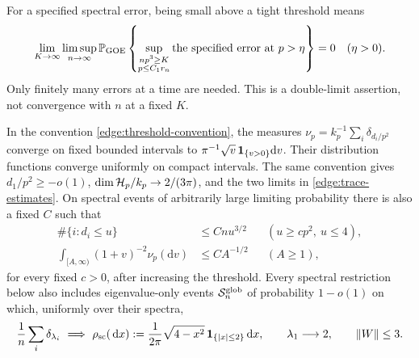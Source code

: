 For a specified spectral error, being small above a tight threshold means
\begin{equation}\label{edge:threshold-convention}
 \lim_{K\to\infty}\limsup_{n\to\infty}
 \mathbb P_{\rm GOE}\left\{
 \sup_{\substack{np^3\ge K\\p\le C_1r_n}}
       \text{the specified error at \(p\)}>\eta\right\}=0
 \quad(\eta>0).
\end{equation}
Only finitely many errors at a time are needed.  This is a double-limit
assertion, not convergence with \(n\) at a fixed \(K\).

\begin{lemma}
\label{edge:spectral}
In the convention \eqref{edge:threshold-convention}, the measures
\(\nu_p=k_p^{-1}\sum_i\delta_{d_i/p^2}\) converge on fixed bounded
intervals to \(\pi^{-1}\sqrt v\,\mathbf 1_{\{v>0\}}\mathrm dv\).  Their
distribution functions converge uniformly on compact intervals.
The same convention gives \(d_1/p^2\ge-o(1)\),
\(\dim\mathcal H_p/k_p\to2/(3\pi)\), and the two limits in
\eqref{edge:trace-estimates}.  On spectral events of arbitrarily large
limiting probability there is also a fixed \(C\) such that
\begin{equation}\label{edge:counting-tail}
 \begin{aligned}
 \#\{i:d_i\le u\}&\le Cnu^{3/2}
       &&(u\ge cp^2,\ u\le4),\\
 \int_{[A,\infty)}(1+v)^{-2}\nu_p(\mathrm dv)&\le CA^{-1/2}
       &&(A\ge1),
 \end{aligned}
\end{equation}
for every fixed \(c>0\), after increasing the threshold.
Every spectral restriction below also includes eigenvalue-only events
\(\mathcal S_n^{\rm glob}\) of probability \(1-o(1)\) on which, uniformly
over their spectra,
\begin{equation}\label{edge:global-spectral}
 \frac1n\sum_i\delta_{\lambda_i}\ \Longrightarrow\
 \rho_{\rm sc}(\,\mathrm d x):=\frac1{2\pi}\sqrt{4-x^2}\,
             \mathbf 1_{\{|x|\le2\}}\,\mathrm d x,\qquad
 \lambda_1\longrightarrow2,\qquad \|W\|\le3 .
\end{equation}
\end{lemma}

